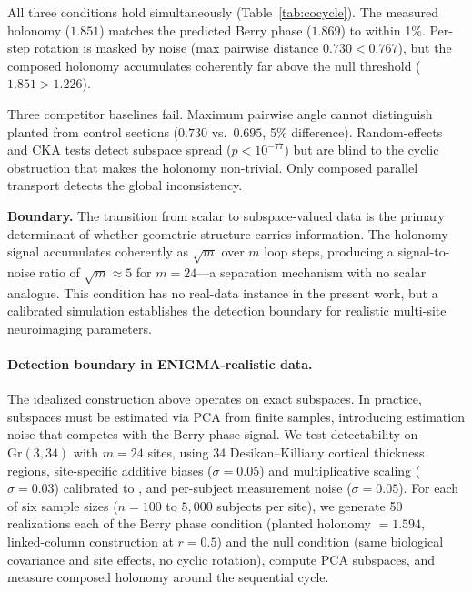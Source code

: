 \documentclass{article}
\newcommand{\Gr}{\mathrm{Gr}}
\begin{document}
All three conditions hold simultaneously (Table~\ref{tab:cocycle}).
The measured holonomy ($1.851$) matches the predicted Berry phase ($1.869$) to within 1\%.
Per-step rotation is masked by noise (max pairwise distance $0.730 < 0.767$), but the composed holonomy accumulates coherently far above the null threshold ($1.851 > 1.226$).

Three competitor baselines fail.
Maximum pairwise angle cannot distinguish planted from control sections ($0.730$ vs.\ $0.695$, 5\% difference).
Random-effects and CKA tests detect subspace spread ($p < 10^{-77}$) but are blind to the cyclic obstruction that makes the holonomy non-trivial.
Only composed parallel transport detects the global inconsistency.

\textbf{Boundary.} The transition from scalar to subspace-valued data is the primary determinant of whether geometric structure carries information.
The holonomy signal accumulates coherently as $\sqrt{m}$ over $m$ loop steps, producing a signal-to-noise ratio of $\sqrt{m} \approx 5$ for $m = 24$---a separation mechanism with no scalar analogue.
This condition has no real-data instance in the present work, but a calibrated simulation establishes the detection boundary for realistic multi-site neuroimaging parameters.

\paragraph{Detection boundary in ENIGMA-realistic data.}
The idealized construction above operates on exact subspaces.
In practice, subspaces must be estimated via PCA from finite samples, introducing estimation noise that competes with the Berry phase signal.
We test detectability on $\Gr(3, 34)$ with $m = 24$ sites, using 34 Desikan--Killiany cortical thickness regions, site-specific additive biases ($\sigma = 0.05$) and multiplicative scaling ($\sigma = 0.03$) calibrated to \citet{fortin2018harmonization}, and per-subject measurement noise ($\sigma = 0.05$).
For each of six sample sizes ($n = 100$ to $5{,}000$ subjects per site), we generate 50 realizations each of the Berry phase condition (planted holonomy $= 1.594$, linked-column construction at $r = 0.5$) and the null condition (same biological covariance and site effects, no cyclic rotation), compute PCA subspaces, and measure composed holonomy around the sequential cycle.
\end{document}

